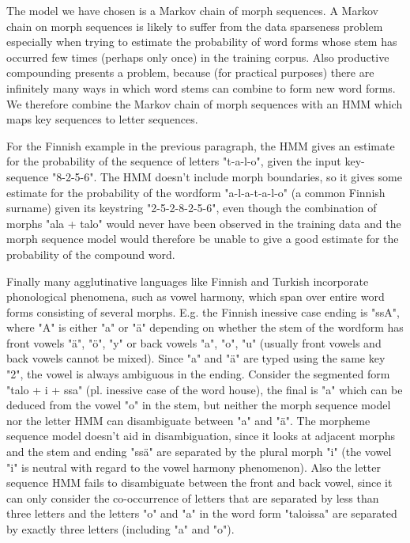 \documentclass{llncs}
\begin{document}
The model we have chosen is a Markov chain of morph sequences. A
Markov chain on morph sequences is likely to suffer from the data
sparseness problem especially when trying to estimate the probability
of word forms whose stem has occurred few times (perhaps only once) in
the training corpus. Also productive compounding presents a problem,
because (for practical purposes) there are infinitely many ways in
which word stems can combine to form new word forms. We therefore
combine the Markov chain of morph sequences with an HMM which maps key
sequences to letter sequences.

For the Finnish example in the previous paragraph, the HMM gives an
estimate for the probability of the sequence of letters "t-a-l-o",
given the input key-sequence "8-2-5-6". The HMM doesn't include
morph boundaries, so it gives some estimate for the probability of
the wordform "a-l-a-t-a-l-o" (a common Finnish surname) given its keystring
"2-5-2-8-2-5-6", even though the combination of morphs "ala + talo"
would never have been observed in the training data and the morph
sequence model would therefore be unable to give a good estimate for
the probability of the compound word.

Finally many agglutinative languages like Finnish and Turkish
incorporate phonological phenomena, such as vowel harmony, which span
over entire word forms consisting of several morphs. E.g. the Finnish
inessive case ending is "ssA", where "A" is either "a" or "\"{a}"
depending on whether the stem of the wordform has front vowels "ä",
"ö", "y" or back vowels "a", "o", "u" (usually front vowels and back
vowels cannot be mixed). Since "a" and "\"{a}" are typed using the
same key "2", the vowel is always ambiguous in the ending. Consider
the segmented form "talo + i + ssa" (pl. inessive case of the word
house), the final is "a" which can be deduced from the vowel "o" in
the stem, but neither the morph sequence model nor the letter HMM can
disambiguate between "a" and "ä". The morpheme sequence model doesn't
aid in disambiguation, since it looks at adjacent morphs and the stem
and ending "ss\"{a}" are separated by the plural morph "i" (the vowel
"i" is neutral with regard to the vowel harmony phenomenon). Also the
letter sequence HMM fails to disambiguate between the front and back
vowel, since it can only consider the co-occurrence of letters that
are separated by less than three letters and the letters "o" and "a"
in the word form "taloissa" are separated by exactly three letters
(including "a" and "o").
\end{document}
